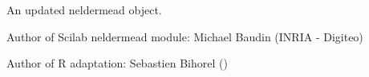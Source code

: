%
\begin{Value}
An updated neldermead object.
\end{Value}
%
\begin{Author}\relax
Author of Scilab neldermead module: Michael Baudin (INRIA - Digiteo)

Author of R adaptation: Sebastien Bihorel ()
\end{Author}
%
\begin{SeeAlso}\relax
{}
\end{SeeAlso}
